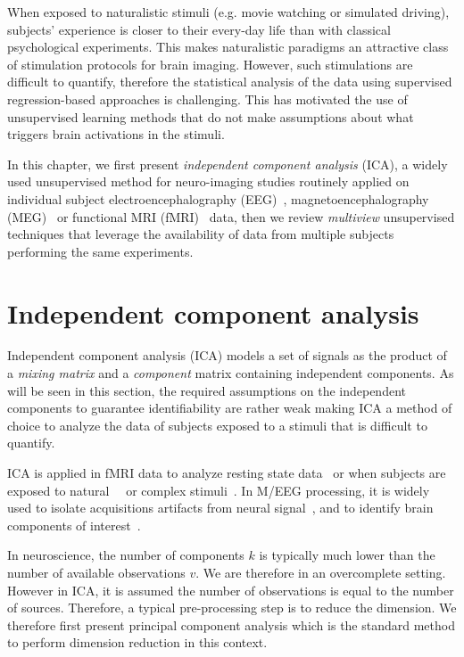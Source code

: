 When exposed to naturalistic stimuli (e.g. movie watching or simulated driving), subjects' experience is closer to their every-day life than with classical
psychological experiments.
% 
This makes naturalistic paradigms an attractive class of
stimulation protocols for brain imaging.
%
However, such stimulations are difficult to quantify, therefore the statistical analysis of the data using supervised regression-based approaches is challenging.
This has motivated the use of unsupervised learning methods that do not make
assumptions about what triggers brain activations in the stimuli.

In this chapter, we first present \emph{independent component analysis} (ICA), a widely used
unsupervised method for neuro-imaging studies routinely applied on individual
subject electroencephalography (EEG)~\cite{makeig1996independent},
magnetoencephalography (MEG)~\cite{vigario1998independent} or functional MRI
(fMRI)~\cite{mckeown1998independent} data, then we review \emph{multiview} unsupervised 
techniques that leverage the availability of data from multiple subjects
performing the same experiments. 

\section{Independent component analysis}
\label{sec:ica}
Independent component analysis (ICA) models a set of signals as the product of a \emph{mixing matrix} and a
\emph{component} matrix containing independent components. As will be seen in this
section, the required assumptions on the independent components to guarantee
identifiability are rather weak making ICA a method of choice to analyze the
data of subjects exposed to a stimuli that is difficult to quantify.

ICA is applied in fMRI data to analyze resting state
data~\cite{beckmann2005investigations} or when subjects are
exposed to natural~\cite{malinen2007towards}~\cite{bartels2005brain} or complex stimuli~\cite{calhoun2002different}. 
In M/EEG processing, it is widely used to isolate acquisitions artifacts from neural signal~\cite{jung1998extended}, and to identify brain components of interest~\cite{vigario2000independent, delorme2012independent}.

In neuroscience, the number of components $k$ is typically much lower than the number
of available observations $v$. We are therefore in an overcomplete setting.
However in ICA, it is assumed the number of observations is equal to the number
of sources. Therefore, a
typical pre-processing step is to reduce the dimension. We therefore first
present principal component analysis which is the standard method to perform
dimension reduction in this context.

